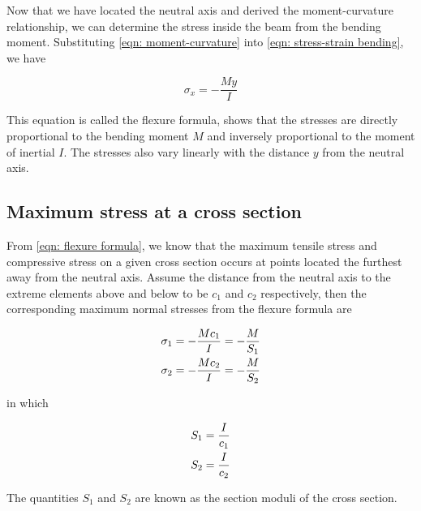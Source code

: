 \documentclass[
10pt,
a4paper,
openany,
svgnames,
]{book}
\begin{document}
Now that we have located the neutral axis and derived the moment-curvature relationship, we can determine the stress inside the beam from the bending moment. Substituting \cref{eqn: moment-curvature} into \cref{eqn: stress-strain bending}, we have

\begin{equation} \label{eqn: flexure formula}
  \sigma_x =  - \frac{My}{I}
\end{equation}

This equation is called the flexure formula, shows that the stresses are directly proportional to the bending moment $M$ and inversely proportional to the moment of inertial $I$. The stresses also vary linearly with the distance $y$ from the neutral axis.

\subsection{Maximum stress at a cross section}

From \cref{eqn: flexure formula}, we know that the maximum tensile stress and compressive stress on a given cross section occurs at points located the furthest away from the neutral axis. Assume the distance from the neutral axis to the extreme elements above and below to be $c_1$ and $c_2$ respectively, then the corresponding maximum normal stresses from the flexure formula are

\begin{equation} \label{eqn: section modulus}
  \begin{gathered}
    \sigma _1 =  - \frac{Mc_1}{I} =  - \frac{M}{S_1} \hfill \\
    \sigma _2 =  - \frac{Mc_2}{I} =  - \frac{M}{S_2} \hfill \\ 
  \end{gathered}
\end{equation}

in which

\[\begin{gathered}
  S_1 = \frac{I}{c_1} \hfill \\
  S_2 = \frac{I}{c_2} \hfill \\ 
\end{gathered} \]

The quantities $S_1$ and $S_2$ are known as the section moduli of the cross section.
\end{document}
